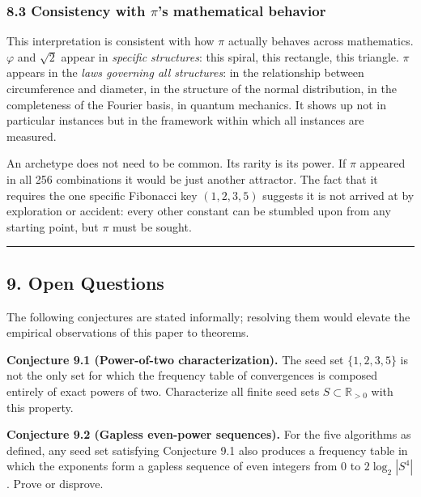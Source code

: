 \documentclass[
  11pt,
  letterpaper,
]{article}
\begin{document}
\subsubsection{\texorpdfstring{8.3 Consistency with \(\pi\)'s
mathematical
behavior}{8.3 Consistency with \textbackslash pi's mathematical behavior}}\label{consistency-with-pis-mathematical-behavior}

This interpretation is consistent with how \(\pi\) actually behaves
across mathematics. \(\varphi\) and \(\sqrt{2}\) appear in
\emph{specific structures}: this spiral, this rectangle, this triangle.
\(\pi\) appears in the \emph{laws governing all structures}: in the
relationship between circumference and diameter, in the structure of the
normal distribution, in the completeness of the Fourier basis, in
quantum mechanics. It shows up not in particular instances but in the
framework within which all instances are measured.

An archetype does not need to be common. Its rarity is its power. If
\(\pi\) appeared in all 256 combinations it would be just another
attractor. The fact that it requires the one specific Fibonacci key
\((1, 2, 3, 5)\) suggests it is not arrived at by exploration or
accident: every other constant can be stumbled upon from any starting
point, but \(\pi\) must be sought.

\begin{center}\rule{0.5\linewidth}{0.5pt}\end{center}

\subsection{9. Open Questions}\label{open-questions}

The following conjectures are stated informally; resolving them would
elevate the empirical observations of this paper to theorems.

\textbf{Conjecture 9.1 (Power-of-two characterization).} The seed set
\(\{1, 2, 3, 5\}\) is not the only set for which the frequency table of
convergences is composed entirely of exact powers of two. Characterize
all finite seed sets \(S \subset \mathbb{R}_{>0}\) with this property.

\textbf{Conjecture 9.2 (Gapless even-power sequences).} For the five
algorithms as defined, any seed set satisfying Conjecture 9.1 also
produces a frequency table in which the exponents form a gapless
sequence of even integers from 0 to \(2\log_2|S^4|\). Prove or disprove.
\end{document}
